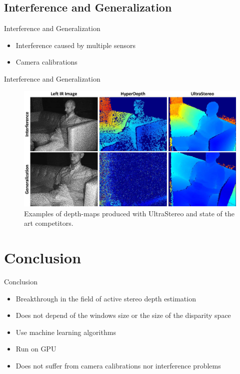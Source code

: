 \subsection{Interference and Generalization}
\begin{frame}{Interference and Generalization}
\begin{itemize}
\item Interference caused by multiple sensors
\item Camera calibrations
\end{itemize}
\end{frame}

\begin{frame}{Interference and Generalization}
\begin{figure}
\includegraphics[scale=0.1]{pictures/fig8}
\caption{Examples of depth-maps produced with UltraStereo and state of the art competitors.}
\end{figure}
\end{frame}

\section{Conclusion}
\begin{frame}{Conclusion}
\begin{itemize}
\item Breakthrough in the field of active stereo depth estimation 
\item Does not depend of the windows size or the size of the disparity space
\item Use machine learning algorithms
\item Run on GPU
\item Does not suffer from camera calibrations nor interference problems
\end{itemize}
\end{frame}
